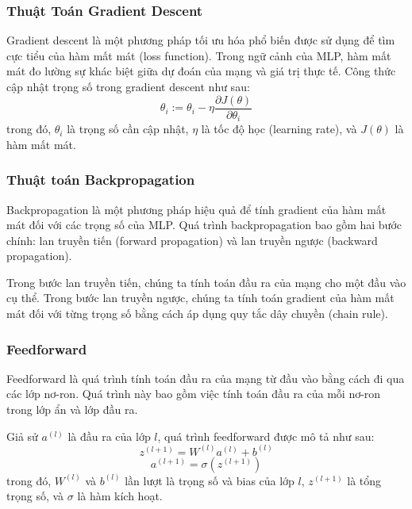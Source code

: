 \subsubsection{Thuật Toán Gradient Descent}

Gradient descent là một phương pháp tối ưu hóa phổ biến được sử dụng để tìm cực tiểu của hàm mất mát (loss function). Trong ngữ cảnh của MLP, hàm mất mát đo lường sự khác biệt giữa dự đoán của mạng và giá trị thực tế.
Công thức cập nhật trọng số trong gradient descent như sau:
\[
\theta_{i} := \theta_{i} - \eta \frac{\partial J(\theta)}{\partial \theta_{i}}
\]
trong đó, \(\theta_{i}\) là trọng số cần cập nhật, \(\eta\) là tốc độ học (learning rate), và \(J(\theta)\) là hàm mất mát.

\subsubsection{Thuật toán Backpropagation}

Backpropagation là một phương pháp hiệu quả để tính gradient của hàm mất mát đối với các trọng số của MLP. Quá trình backpropagation bao gồm hai bước chính: lan truyền tiến (forward propagation) và lan truyền ngược (backward propagation).

Trong bước lan truyền tiến, chúng ta tính toán đầu ra của mạng cho một đầu vào cụ thể. Trong bước lan truyền ngược, chúng ta tính toán gradient của hàm mất mát đối với từng trọng số bằng cách áp dụng quy tắc dây chuyền (chain rule).

\subsubsection{Feedforward}

Feedforward là quá trình tính toán đầu ra của mạng từ đầu vào bằng cách đi qua các lớp nơ-ron. Quá trình này bao gồm việc tính toán đầu ra của mỗi nơ-ron trong lớp ẩn và lớp đầu ra.

Giả sử \(a^{(l)}\) là đầu ra của lớp \(l\), quá trình feedforward được mô tả như sau:
\[
z^{(l+1)} = W^{(l)}a^{(l)} + b^{(l)}
\]
\[
a^{(l+1)} = \sigma(z^{(l+1)})
\]
trong đó, \(W^{(l)}\) và \(b^{(l)}\) lần lượt là trọng số và bias của lớp \(l\), \(z^{(l+1)}\) là tổng trọng số, và \(\sigma\) là hàm kích hoạt.